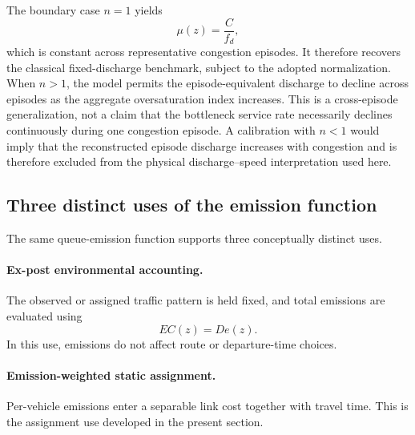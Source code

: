 The boundary case $n=1$ yields
\begin{equation}
\mu(z)=\frac{C}{f_d},
\end{equation}
which is constant across representative congestion episodes. It therefore
recovers the classical fixed-discharge benchmark, subject to the adopted
normalization. When $n>1$, the model permits the episode-equivalent discharge
to decline across episodes as the aggregate oversaturation index increases.
This is a cross-episode generalization, not a claim that the bottleneck
service rate necessarily declines continuously during one congestion episode.
A calibration with $n<1$ would imply that the reconstructed episode discharge
increases with congestion and is therefore excluded from the physical
discharge--speed interpretation used here.



\subsection{Three distinct uses of the emission function}
\label{subsec:three_uses}

The same queue-emission function supports three conceptually distinct uses.

\paragraph{Ex-post environmental accounting.}
The observed or assigned traffic pattern is held fixed, and total emissions
are evaluated using
\begin{equation}
EC(z)=D e(z).
\end{equation}
In this use, emissions do not affect route or departure-time choices.

\paragraph{Emission-weighted static assignment.}
Per-vehicle emissions enter a separable link cost together with travel time.
This is the assignment use developed in the present section.

